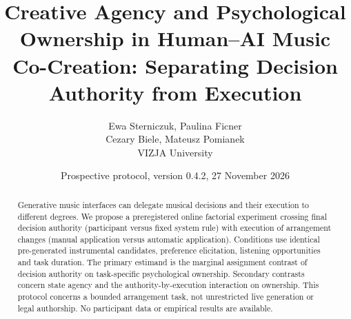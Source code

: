 \documentclass[11pt]{article}
\title{Creative Agency and Psychological Ownership in Human--AI Music Co-Creation: Separating Decision Authority from Execution}
\author{Ewa Sterniczuk, Paulina Ficner\\Cezary Biele, Mateusz Pomianek\\[0.4em]\small VIZJA University}
\date{Prospective protocol, version 0.4.2, 27 November 2026}
\begin{document}
\maketitle
\begin{abstract}
Generative music interfaces can delegate musical decisions and their execution to different degrees. We propose a preregistered online factorial experiment crossing final decision authority (participant versus fixed system rule) with execution of arrangement changes (manual application versus automatic application). Conditions use identical pre-generated instrumental candidates, preference elicitation, listening opportunities and task duration. The primary estimand is the marginal assignment contrast of decision authority on task-specific psychological ownership. Secondary contrasts concern state agency and the authority-by-execution interaction on ownership. This protocol concerns a bounded arrangement task, not unrestricted live generation or legal authorship. No participant data or empirical results are available.
\end{abstract}
\end{document}
